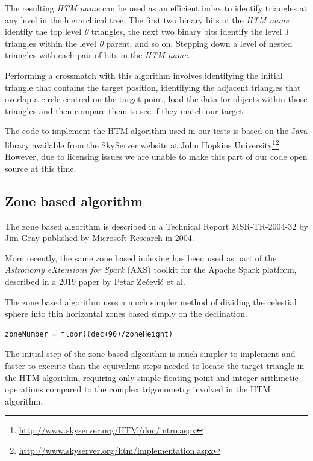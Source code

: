 \documentclass{article}
\newcommand{\centred} {centred\xspace}
\newcommand{\spark} {Spark\xspace}
\newcommand{\apache} {Apache\xspace}
\newcommand{\crossmatch} {crossmatch\xspace}
\newcommand{\footurl}[1] {\footnote{\url{#1}}}
\begin{document}
The resulting \textit{HTM name} can be used as an efficient index to identify triangles at any level in the hierarchical tree. The first two binary bits of the \textit{HTM name} identify the top level \textit{0} triangles, the next two binary bits identify the level \textit{1} triangles within the level \textit{0} parent, and so on. Stepping down a level of nested triangles with each pair of bits in the \textit{HTM name}.

Performing a \crossmatch with this algorithm involves identifying the initial triangle that contains the target position, identifying the adjacent triangles that overlap a circle \centred on the target point, load the data for objects within those triangles and then compare them to see if they match our target.

The code to implement the HTM algorithm used in our tests is based on the Java library available from the SkyServer website at John Hopkins University\footurl{http://www.skyserver.org/HTM/doc/intro.aspx}\footurl{http://www.skyserver.org/htm/implementation.aspx}. However, due to licensing issues we are unable to make this part of our code open source at this time.

\subsection{Zone based algorithm}
\label{crossmatch-zones}

The zone based algorithm is described in a Technical Report MSR-TR-2004-32 by Jim Gray published by Microsoft Research in 2004\cite{Gray-2004}.

More recently, the same zone based indexing has been used as part of the \textit{Astronomy eXtensions for Spark} (AXS) toolkit for the \apache \spark platform, described in a 2019 paper by Petar Zečević et al\cite{Zecevic-2019}.

The zone based algorithm uses a much simpler method of dividing the celestial sphere into thin horizontal zones based simply on the declination.

\begin{lstlisting}[]
    zoneNumber = floor((dec+90)/zoneHeight)
\end{lstlisting}

The initial step of the zone based algorithm is much simpler to implement and faster to execute than the equivalent steps needed to locate the target triangle in the HTM algorithm, requiring only simple floating point and integer arithmetic operations compared to the complex trigonometry involved in the HTM algorithm.
\end{document}
